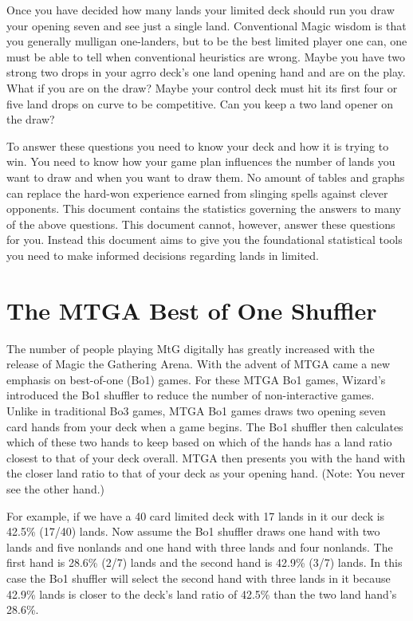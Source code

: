 \documentclass[oneside]{book}   %
\begin{document}
Once you have decided how many lands your limited deck should run you draw your opening seven and see just a single land. Conventional Magic wisdom is that you generally mulligan one-landers, but to be the best limited player one can, one must be able to tell when conventional heuristics are wrong. Maybe you have two strong two drops in your agrro deck's one land opening hand and are on the play. What if you are on the draw? Maybe your control deck must hit its first four or five land drops on curve to be competitive. Can you keep a two land opener on the draw? 

To answer these questions you need to know your deck and how it is trying to win. You need to know how your game plan influences the number of lands you want to draw and when you want to draw them. No amount of tables and graphs can replace the hard-won experience earned from slinging spells against clever opponents. This document contains the statistics governing the answers to many of the above questions. This document cannot, however, answer these questions for you. Instead this document aims to give you the foundational statistical tools you need to make informed decisions regarding lands in limited.

\section{The MTGA Best of One Shuffler}
\label{sec:computers_overview}

The number of people playing MtG digitally has greatly increased with the release of Magic the Gathering Arena. With the advent of MTGA came a new emphasis on best-of-one (Bo1) games. For these MTGA Bo1 games, Wizard's introduced the Bo1 shuffler to reduce the number of non-interactive games. Unlike in traditional Bo3 games, MTGA Bo1 games draws two opening seven card hands from your deck when a game begins. The Bo1 shuffler then calculates which of these two hands to keep based on which of the hands has a land ratio closest to that of your deck overall. MTGA then presents you with the hand with the closer land ratio to that of your deck as your opening hand. (Note: You never see the other hand.)

For example, if we have a 40 card limited deck with 17 lands in it our deck is 42.5\% (17/40) lands. Now assume the Bo1 shuffler draws one hand with two lands and five nonlands and one hand with three lands and four nonlands. The first hand is 28.6\% (2/7) lands and the second hand is 42.9\% (3/7) lands. In this case the Bo1 shuffler will select the second hand with three lands in it because 42.9\% lands is closer to the deck's land ratio of 42.5\% than the two land hand's 28.6\%. 
\end{document}
